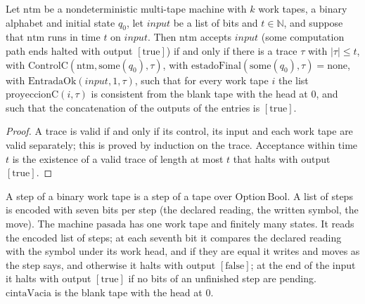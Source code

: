 \begin{theorem}
  \label{thm:machines-trace-certificate}
  \leanok
  Let $\mathrm{ntm}$ be a nondeterministic multi-tape machine with $k$ work tapes, a binary alphabet and
  initial state $q_0$, let $\mathit{input}$ be a list of bits and $t \in \mathbb{N}$, and suppose that
  $\mathrm{ntm}$ runs in time $t$ on $\mathit{input}$. Then $\mathrm{ntm}$ accepts $\mathit{input}$ (some
  computation path ends halted with output $[\mathrm{true}]$) if and only if there is a trace $\tau$ with
  $|\tau| \le t$, with $\mathrm{ControlC}(\mathrm{ntm}, \mathrm{some}(q_0), \tau)$, with
  $\mathrm{estadoFinal}(\mathrm{some}(q_0), \tau) = \mathrm{none}$, with $\mathrm{EntradaOk}(\mathit{input}, 1, \tau)$,
  such that for every work tape $i$ the list $\mathrm{proyeccionC}(i, \tau)$ is consistent from the blank tape
  with the head at $0$, and such that the concatenation of the outputs of the entries is $[\mathrm{true}]$.
\end{theorem}

\begin{proof}
  \leanok
  A trace is valid if and only if its control, its input and each work tape are valid separately; this is
  proved by induction on the trace. Acceptance within time $t$ is the existence of a valid trace of length at
  most $t$ that halts with output $[\mathrm{true}]$.
\end{proof}

\begin{definition}
  \label{def:machines-pass}
  \leanok
  A step of a binary work tape is a step of a tape over $\mathrm{Option}\ \mathrm{Bool}$. A list of steps is
  encoded with seven bits per step (the declared reading, the written symbol, the move). The machine
  $\mathrm{pasada}$ has one work tape and finitely many states. It reads the encoded list of steps; at each
  seventh bit it compares the declared reading with the symbol under its work head, and if they are equal it
  writes and moves as the step says, and otherwise it halts with output $[\mathrm{false}]$; at the end of the
  input it halts with output $[\mathrm{true}]$ if no bits of an unfinished step are pending. $\mathrm{cintaVacia}$ is the blank
  tape with the head at $0$.
  \own{}
  \infrastructure{}
\end{definition}

